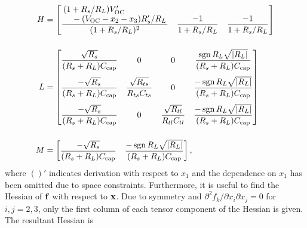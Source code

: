 \documentclass[../zhang_thesis.tex]{subfiles}
\begin{document}
\begin{align}
    H & = \begin{bmatrix}
            \dfrac{\splitfrac{(1+R_s/R_L)V_\text{OC}'}{- (V_\text{OC}-x_2-x_3)R_s'/R_L}}{(1+R_s/R_L)^2} & \dfrac{-1}{1+R_s/R_L} & \dfrac{-1}{1+R_s/R_L}
        \end{bmatrix} \\[3ex]
    L & = \begin{bmatrix}
            \dfrac{\sqrt{R_s}}{(R_s+R_L)C_\text{cap}} & 0 & 0 & \dfrac{\sgn{R_L}\sqrt{|R_L|}}{(R_s+R_L)C_\text{cap}} \\[3ex]
            \dfrac{-\sqrt{R_s}}{(R_s+R_L)C_\text{cap}} & \dfrac{\sqrt{R_{ts}}}{R_{ts}C_{ts}} & 0 & \dfrac{-\sgn{R_L}\sqrt{|R_L|}}{(R_s+R_L)C_\text{cap}} \\[3ex]
            \dfrac{-\sqrt{R_s}}{(R_s+R_L)C_\text{cap}} & 0 & \dfrac{\sqrt{R_{tl}}}{R_{tl}C_{tl}} & \dfrac{-\sgn{R_L}\sqrt{|R_L|}}{(R_s+R_L)C_\text{cap}}
        \end{bmatrix} \\[3ex]
    M & = \begin{bmatrix}
            \dfrac{-\sqrt{R_s}}{(R_s+R_L)C_\text{cap}} & \dfrac{-\sgn{R_L}\sqrt{|R_L|}}{(R_s+R_L)C_\text{cap}}
        \end{bmatrix} ,
\end{align}
where $()'$ indicates derivation with respect to $x_1$ and the dependence on $x_1$ has been omitted due to space constraints. Furthermore, it is useful to find the Hessian of $\mathbf{f}$ with respect to $\mathbf{x}$. Due to symmetry and $\partial^2 f_k/\partial x_i\partial x_j = 0$ for $i,j=2,3$, only the first column of each tensor component of the Hessian is given. The resultant Hessian is
\end{document}
